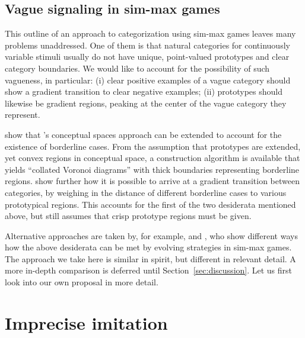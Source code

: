 \documentclass[fleqn,reqno,10pt]{article}
\begin{document}
\subsection{Vague signaling in sim-max games}

This outline of an approach to categorization using sim-max games
leaves many problems unaddressed. One of them is that natural
categories for continuously variable stimuli usually do not have
unique, point-valued prototypes and clear category boundaries. We
would like to account for the possibility of such vagueness, in
particular: (i) clear positive examples of a vague category should
show a gradient transition to clear negative examples;
(ii) prototypes should likewise be gradient regions, peaking at the
center of the vague category they represent.

\citet{DouvenDecock2011:Vagueness:-A-Co} show that
\citeauthor{Gardenfors2000:Conceptual-Spac}'s conceptual spaces
approach can be extended to account for the existence of borderline
cases. From the assumption that prototypes are extended, yet convex
regions in conceptual space, a construction algorithm is available
that yields ``collated Voronoi diagrams'' with thick boundaries
representing borderline
regions. \citet{DecockDouven2012:What-is-Graded-} show further how it
is possible to arrive at a gradient transition between categories, by
weighing in the distance of different borderline cases to various
prototypical regions. This accounts for the first of the two
desiderata mentioned above, but still assumes that crisp prototype
regions must be given.

Alternative approaches are taken by, for example, \citet{FrankeJager2010:Vagueness-Signa} and
\citet{OConnor2013:The-Evolution-o}, who show different ways how the above desiderata can be met by evolving
strategies in sim-max games. The approach we take here is similar in spirit, but different in
relevant detail. A more in-depth comparison is deferred until Section~\ref{sec:discussion}. Let
us first look into our own proposal in more detail.



\section{Imprecise imitation}
\label{sec:repl-diff-dynam}
\end{document}
